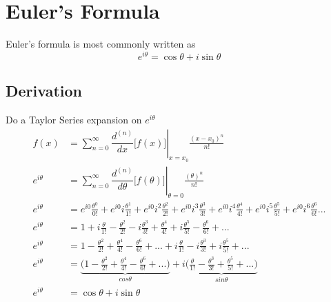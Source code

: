 \section{Euler's Formula}
Euler's formula is most commonly written as 
\[e^{i\theta} = \cos{\theta} + i\sin{\theta}\]

\subsection{Derivation}
Do a Taylor Series expansion on \(e^{i\theta}\)
\begin{align*}
f(x) &= \sum_{n=0}^{\infty}{\left.\dfrac{d^{(n)}}{dx}\bigg[f(x)\bigg]\right|_{x=x_0}\frac{(x-x_0)^n}{n!}} \\
e^{i\theta} &= \sum_{n=0}^{\infty}{\left.\dfrac{d^{(n)}}{d\theta}\bigg[f(\theta)\bigg]\right|_{\theta=0}\frac{(\theta)^n}{n!}} \\
e^{i\theta} &= e^{i0}\frac{\theta^0}{0!} + e^{i0}i\frac{\theta^1}{1!} +e^{i0}i^2\frac{\theta^2}{2!}+e^{i0}i^3\frac{\theta^3}{3!}+e^{i0}i^4\frac{\theta^4}{4!}+e^{i0}i^5\frac{\theta^5}{5!}+e^{i0}i^6\frac{\theta^6}{6!}... \\
e^{i\theta} &= 1 + i\frac{\theta}{1!} - \frac{\theta^2}{2!}-i\frac{\theta^3}{3!}+\frac{\theta^4}{4!}+i\frac{\theta^5}{5!}-\frac{\theta^6}{6!}+... \\
e^{i\theta} &= 1 - \frac{\theta^2}{2!}+\frac{\theta^4}{4!}-\frac{\theta^6}{6!} + ... + i\frac{\theta}{1!}-i\frac{\theta^3}{3!}+i\frac{\theta^5}{5!} + ... \\
e^{i\theta} &= \underbrace{\bigg(1 - \frac{\theta^2}{2!}+\frac{\theta^4}{4!}-\frac{\theta^6}{6!} + ...\bigg)}_{cos\theta} + i\underbrace{\bigg(\frac{\theta}{1!}-\frac{\theta^3}{3!}+\frac{\theta^5}{5!} + ...\bigg)}_{sin\theta} \\
e^{i\theta} &= \cos{\theta} + i\sin{\theta}
\end{align*}
